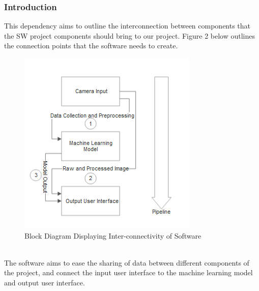 \documentclass[onecolumn, draftclsnofoot,10pt, compsoc]{IEEEtran}
\begin{document}
\subsubsection{Introduction}
This dependency aims to outline the interconnection between components that the SW project components should bring to our project.
Figure 2 below outlines the connection points that the software needs to create.
\begin{figure}[ht]
    \centering
    \includegraphics{SWDependency.png}
    \caption{Block Diagram Displaying Inter-connectivity of Software}
    \label{fig:Figure 4}
\end{figure}\\
The software aims to ease the sharing of data between different components of the project, and connect the input user interface to the machine learning model and output user interface.
\end{document}
